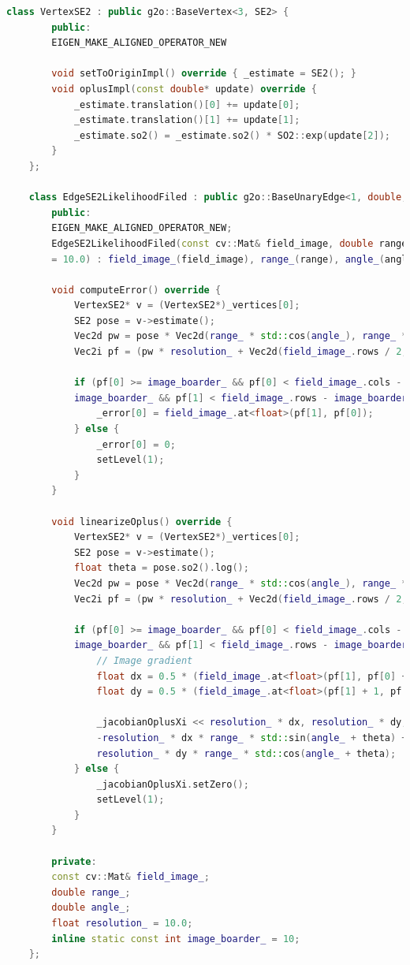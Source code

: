 \begin{lstlisting}[language=c++,caption=src/ch6/g2o\_types.h]
	class VertexSE2 : public g2o::BaseVertex<3, SE2> {
		public:
		EIGEN_MAKE_ALIGNED_OPERATOR_NEW
		
		void setToOriginImpl() override { _estimate = SE2(); }
		void oplusImpl(const double* update) override {
			_estimate.translation()[0] += update[0];
			_estimate.translation()[1] += update[1];
			_estimate.so2() = _estimate.so2() * SO2::exp(update[2]);
		}
	};
	
	class EdgeSE2LikelihoodFiled : public g2o::BaseUnaryEdge<1, double, VertexSE2> {
		public:
		EIGEN_MAKE_ALIGNED_OPERATOR_NEW;
		EdgeSE2LikelihoodFiled(const cv::Mat& field_image, double range, double angle, float resolution 
		= 10.0) : field_image_(field_image), range_(range), angle_(angle), resolution_(resolution) {}
		
		void computeError() override {
			VertexSE2* v = (VertexSE2*)_vertices[0];
			SE2 pose = v->estimate();
			Vec2d pw = pose * Vec2d(range_ * std::cos(angle_), range_ * std::sin(angle_));
			Vec2i pf = (pw * resolution_ + Vec2d(field_image_.rows / 2, field_image_.cols / 2)).cast<int>(); 
			
			if (pf[0] >= image_boarder_ && pf[0] < field_image_.cols - image_boarder_ && pf[1] >= 
			image_boarder_ && pf[1] < field_image_.rows - image_boarder_) {
				_error[0] = field_image_.at<float>(pf[1], pf[0]);
			} else {
				_error[0] = 0;
				setLevel(1);
			}
		}
		
		void linearizeOplus() override {
			VertexSE2* v = (VertexSE2*)_vertices[0];
			SE2 pose = v->estimate();
			float theta = pose.so2().log();
			Vec2d pw = pose * Vec2d(range_ * std::cos(angle_), range_ * std::sin(angle_));
			Vec2i pf = (pw * resolution_ + Vec2d(field_image_.rows / 2, field_image_.cols / 2)).cast<int>();
			
			if (pf[0] >= image_boarder_ && pf[0] < field_image_.cols - image_boarder_ && pf[1] >= 
			image_boarder_ && pf[1] < field_image_.rows - image_boarder_) {
				// Image gradient
				float dx = 0.5 * (field_image_.at<float>(pf[1], pf[0] + 1) - field_image_.at<float>(pf[1], pf[0] - 1));
				float dy = 0.5 * (field_image_.at<float>(pf[1] + 1, pf[0]) - field_image_.at<float>(pf[1] - 1, pf[0]));
				
				_jacobianOplusXi << resolution_ * dx, resolution_ * dy,
				-resolution_ * dx * range_ * std::sin(angle_ + theta) +
				resolution_ * dy * range_ * std::cos(angle_ + theta);
			} else {
				_jacobianOplusXi.setZero();
				setLevel(1);
			}
		}
		
		private:
		const cv::Mat& field_image_;
		double range_;
		double angle_;
		float resolution_ = 10.0;
		inline static const int image_boarder_ = 10;
	};
\end{lstlisting}

